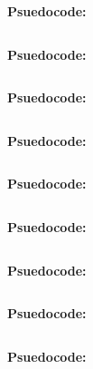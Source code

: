 \textbf{Psuedocode:}
\begin{verbatim}
\end{verbatim}



\textbf{Psuedocode:}
\begin{verbatim}
\end{verbatim}



\textbf{Psuedocode:}
\begin{verbatim}
\end{verbatim}



\textbf{Psuedocode:}
\begin{verbatim}
\end{verbatim}



\textbf{Psuedocode:}
\begin{verbatim}
\end{verbatim}



\textbf{Psuedocode:}
\begin{verbatim}
\end{verbatim}



\textbf{Psuedocode:}
\begin{verbatim}
\end{verbatim}



\textbf{Psuedocode:}
\begin{verbatim}
\end{verbatim}



\textbf{Psuedocode:}
\begin{verbatim}
\end{verbatim}

